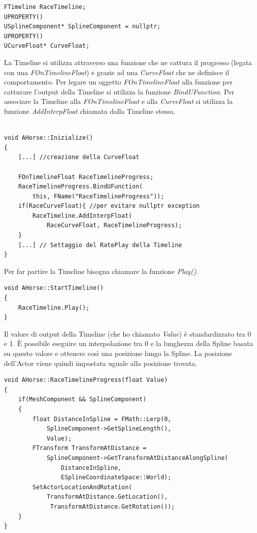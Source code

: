         \begin{lstlisting}[caption = Sezione del file header (movimento cavallo)]
FTimeline RaceTimeline;
UPROPERTY()
USplineComponent* SplineComponent = nullptr;
UPROPERTY()
UCurveFloat* CurveFloat;
        \end{lstlisting}

        La Timeline si utilizza attraverso una funzione che ne cattura il progresso (legata con una \textit{FOnTimelineFloat}) e grazie ad una \textit{CurveFloat} che ne definisce il comportamento. 
        Per legare un oggetto \textit{FOnTimelineFloat} alla funzione per catturare l'output della Timeline si utilizza la funzione \textit{BindUFunction}.
        Per associare la Timeline alla \textit{FOnTimelineFloat} e alla \textit{CurveFloat} si utilizza la funzione \textit{AddInterpFloat} chiamata dalla Timeline stessa.

        \begin{lstlisting}[caption = Inizializzazione della Timeline nel file source (movimento cavallo)]

void AHorse::Inizialize()
{
    [...] //creazione della CurveFloat

    FOnTimelineFloat RaceTimelineProgress;
    RaceTimelineProgress.BindUFunction(
        this, FName("RaceTimelineProgress"));
    if(RaceCurveFloat){ //per evitare nullptr exception
        RaceTimeline.AddInterpFloat(
            RaceCurveFloat, RaceTimelineProgress);
    }
    [...] // Settaggio del RatePlay della Timeline 
}

        \end{lstlisting}

        Per far partire la Timeline bisogna chiamare la funzione \textit{Play()}.

        \begin{lstlisting}
void AHorse::StartTimeline()
{
    RaceTimeline.Play();
}\end{lstlisting}

        Il valore di output della Timeline (che ho chiamato \textit{Value}) è standardizzato tra 0 e 1.
        È possibile eseguire un interpolazione tra 0 e la lunghezza della Spline basata su questo valore e ottenere così una posizione lungo la Spline.
        La posizione dell'Actor viene quindi impostata uguale alla posizione trovata.

        \begin{lstlisting}[caption = Funzione che sfrutta il valore restituito dalla timeline nel tempo  (movimento cavallo)]
void AHorse::RaceTimelineProgress(float Value)
{    
    if(MeshComponent && SplineComponent)
    {
        float DistanceInSpline = FMath::Lerp(0, 
            SplineComponent->GetSplineLength(), 
            Value);
        FTransform TransformAtDistance = 
            SplineComponent->GetTransformAtDistanceAlongSpline(
                DistanceInSpline, 
                ESplineCoordinateSpace::World);
        SetActorLocationAndRotation(
            TransformAtDistance.GetLocation(),
             TransformAtDistance.GetRotation());
    }
}
        \end{lstlisting}

